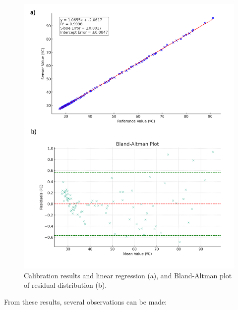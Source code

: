 \documentclass[conference]{IEEEtran}
\begin{document}
   \begin{figure}[h]
      \centering
      \includegraphics[width=\linewidth]{images/final results.png}
      \caption{Calibration results and linear regression (a), and Bland-Altman plot of residual distribution (b).}
      \label{fig:final}
      \end{figure}
      
      From these results, several observations can be made:
      
\end{document}
